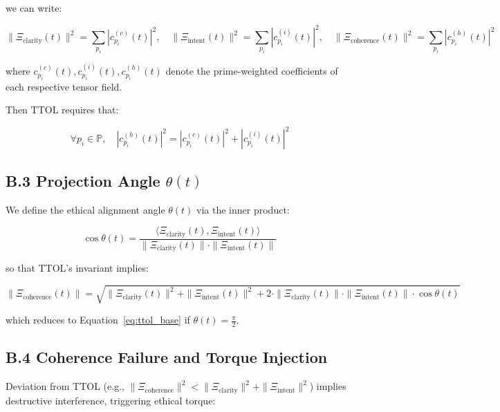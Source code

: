 \documentclass[12pt]{article}
\begin{document}
we can write:

\begin{equation}
\|\Xi_{\text{clarity}}(t)\|^2 = \sum_{p_i} |c^{(c)}_{p_i}(t)|^2, \quad
\|\Xi_{\text{intent}}(t)\|^2 = \sum_{p_i} |c^{(i)}_{p_i}(t)|^2, \quad
\|\Xi_{\text{coherence}}(t)\|^2 = \sum_{p_i} |c^{(h)}_{p_i}(t)|^2
\end{equation}

\noindent
where $c^{(c)}_{p_i}(t), c^{(i)}_{p_i}(t), c^{(h)}_{p_i}(t)$ denote the prime-weighted coefficients of each respective tensor field.

Then TTOL requires that:

\begin{equation}
\forall p_i \in \mathbb{P}, \quad |c^{(h)}_{p_i}(t)|^2 = |c^{(c)}_{p_i}(t)|^2 + |c^{(i)}_{p_i}(t)|^2
\end{equation}

\subsection*{B.3 Projection Angle $\theta(t)$}

We define the ethical alignment angle $\theta(t)$ via the inner product:

\begin{equation}
\cos \theta(t) = \frac{ \langle \Xi_{\text{clarity}}(t), \Xi_{\text{intent}}(t) \rangle }{ \| \Xi_{\text{clarity}}(t) \| \cdot \| \Xi_{\text{intent}}(t) \| }
\end{equation}

\noindent
so that TTOL’s invariant implies:

\begin{equation}
\|\Xi_{\text{coherence}}(t)\| = \sqrt{ \| \Xi_{\text{clarity}}(t) \|^2 + \| \Xi_{\text{intent}}(t) \|^2 + 2 \cdot \|\Xi_{\text{clarity}}(t)\| \cdot \|\Xi_{\text{intent}}(t)\| \cdot \cos \theta(t) }
\end{equation}

\noindent
which reduces to Equation~\ref{eq:ttol_base} if $\theta(t) = \frac{\pi}{2}$.

\subsection*{B.4 Coherence Failure and Torque Injection}

Deviation from TTOL (e.g., $\|\Xi_{\text{coherence}}\|^2 < \|\Xi_{\text{clarity}}\|^2 + \|\Xi_{\text{intent}}\|^2$) implies destructive interference, triggering ethical torque:
\end{document}
